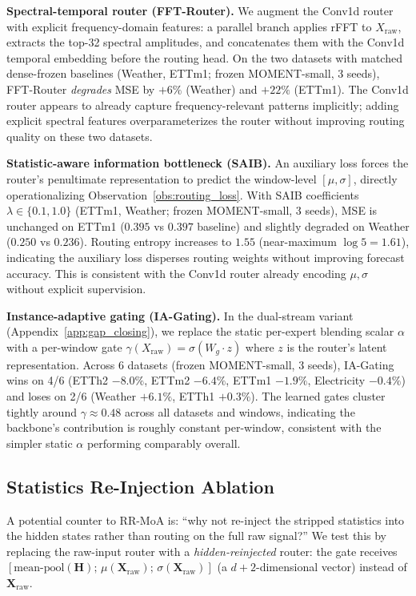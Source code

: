 \documentclass{article}
\begin{document}
\textbf{Spectral-temporal router (FFT-Router).} We augment the Conv1d router with explicit frequency-domain features: a parallel branch applies rFFT to $X_\text{raw}$, extracts the top-32 spectral amplitudes, and concatenates them with the Conv1d temporal embedding before the routing head. On the two datasets with matched dense-frozen baselines (Weather, ETTm1; frozen MOMENT-small, 3 seeds), FFT-Router \emph{degrades} MSE by $+6\%$ (Weather) and $+22\%$ (ETTm1). The Conv1d router appears to already capture frequency-relevant patterns implicitly; adding explicit spectral features overparameterizes the router without improving routing quality on these two datasets.

\textbf{Statistic-aware information bottleneck (SAIB).} An auxiliary loss forces the router's penultimate representation to predict the window-level $[\mu, \sigma]$, directly operationalizing Observation~\ref{obs:routing_loss}. With SAIB coefficients $\lambda \in \{0.1, 1.0\}$ (ETTm1, Weather; frozen MOMENT-small, 3 seeds), MSE is unchanged on ETTm1 ($0.395$ vs $0.397$ baseline) and slightly degraded on Weather ($0.250$ vs $0.236$). Routing entropy increases to $1.55$ (near-maximum $\log 5 = 1.61$), indicating the auxiliary loss disperses routing weights without improving forecast accuracy. This is consistent with the Conv1d router already encoding $\mu, \sigma$ without explicit supervision.

\textbf{Instance-adaptive gating (IA-Gating).} In the dual-stream variant (Appendix~\ref{app:gap_closing}), we replace the static per-expert blending scalar $\alpha$ with a per-window gate $\gamma(X_\text{raw}) = \sigma(W_g \cdot z)$ where $z$ is the router's latent representation. Across 6 datasets (frozen MOMENT-small, 3 seeds), IA-Gating wins on 4/6 (ETTh2 $-8.0\%$, ETTm2 $-6.4\%$, ETTm1 $-1.9\%$, Electricity $-0.4\%$) and loses on 2/6 (Weather $+6.1\%$, ETTh1 $+0.3\%$). The learned gates cluster tightly around $\gamma \approx 0.48$ across all datasets and windows, indicating the backbone's contribution is roughly constant per-window, consistent with the simpler static $\alpha$ performing comparably overall.

\subsection{Statistics Re-Injection Ablation}
\label{app:reinjection}

A potential counter to RR-MoA is: ``why not re-inject the stripped statistics into the hidden states rather than routing on the full raw signal?'' We test this by replacing the raw-input router with a \emph{hidden-reinjected} router: the gate receives $[\text{mean-pool}(\mathbf{H});\, \mu(\mathbf{X}_\text{raw});\, \sigma(\mathbf{X}_\text{raw})]$ (a $d{+}2$-dimensional vector) instead of $\mathbf{X}_\text{raw}$.
\end{document}
